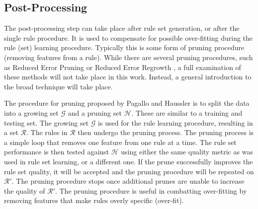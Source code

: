 
\subsection{Post-Processing} \label{chap:rule:post}

The post-processing step can take place after rule set generation, or after the single rule procedure. It is used to compensate for possible over-fitting during the rule (set) learning procedure. Typically this is some form of pruning procedure (removing features from a rule). While there are several pruning procedures, such as Reduced Error Pruning \cite{brunk1991rep} or Reduced Error Regrowth \cite{cohen1993pruning}, a full examination of these methods will not take place in this work. Instead, a general introduction to the broad technique will take place.

The procedure for pruning proposed by Pagallo and Haussler \cite{pagallo1990pruning} is to split the data into a growing set $\mathcal{G}$ and a pruning set $\mathcal{H}$. These are similar to a training and testing set. The growing set $\mathcal{G}$ is used for the rule learning procedure, resulting in a set $\mathcal{R}$.
The rules in $\mathcal{R}$ then undergo the pruning process. The pruning process is a simple loop that removes one feature from one rule at a time. The rule set performance is then tested against $\mathcal{H}$ using either the same quality metric as was used in rule set learning, or a different one. If the prune successfully improves the rule set quality, it will be accepted and the pruning procedure will be repeated on $\mathcal{R}'$. The pruning procedure stops once additional prunes are unable to increase the quality of $\mathcal{R}'$. The pruning procedure is useful in combatting over-fitting by removing features that make rules overly specific (over-fit).



